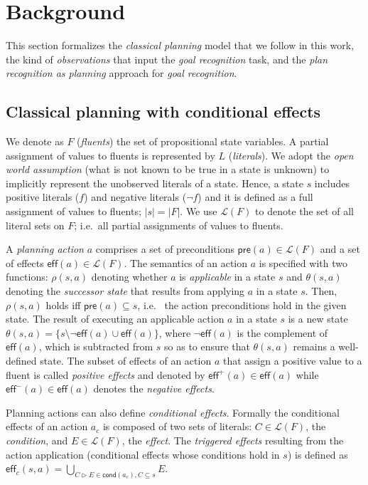 \documentclass[letterpaper]{article} %
\newcommand{\pre}{\mathsf{pre}}     %
\newcommand{\eff}{\mathsf{eff}}     %
\newcommand{\cond}{\mathsf{cond}}   %
\begin{document}
\section{Background}
\label{sec:background}
This section formalizes the {\em classical planning} model that we follow in this work, the kind of {\em observations} that input the {\em goal recognition} task, and the {\em plan recognition as planning} approach for {\em goal recognition}.  

\subsection{Classical planning with conditional effects}
We denote as $F$ ({\em fluents}) the set of  propositional state variables. A partial assignment of values to fluents is represented by $L$ ({\em literals}). We adopt the \emph{open world assumption} (what is not known to be true in a state is unknown) to implicitly represent the unobserved literals of a state. Hence, a state $s$ includes positive literals ($f$) and negative literals ($\neg f$) and it is defined as a full assignment of values to fluents; $|s|=|F|$. We use $\mathcal{L}(F)$ to denote the set of all literal sets on $F$; i.e.~all partial assignments of values to fluents.

A {\em planning action} $a$ comprises a set of preconditions $\pre(a)\in\mathcal{L}(F)$ and a set of effects $\eff(a)\in\mathcal{L}(F)$. The semantics of an action $a$ is specified with two functions: $\rho(s,a)$ denoting whether $a$ is {\em applicable} in a state $s$ and $\theta(s,a)$ denoting the {\em successor state} that results from applying $a$ in a state $s$. Then, $\rho(s,a)$ holds iff $\pre(a)\subseteq s$, i.e.~ the action preconditions hold in the given state. The result of executing an applicable action $a$ in a state $s$ is a new state $\theta(s,a)=\{s\setminus \neg\eff(a)\cup\eff(a)\}$, where $\neg\eff(a)$ is the complement of $\eff(a)$, which is subtracted from $s$ so as to ensure that $\theta(s,a)$ remains a well-defined state. The subset of effects of an action $a$ that assign a positive value to a fluent is called {\em positive effects} and denoted by $\eff^+(a)\in \eff(a)$ while $\eff^-(a)\in \eff(a)$ denotes the {\em negative effects}.

Planning actions can also define {\em conditional effects}. Formally the conditional effects of an action $a_c$ is composed of two sets of literals: $C\in\mathcal{L}(F)$, the {\em condition}, and $E\in\mathcal{L}(F)$, the {\em effect}. The {\em triggered effects} resulting from the action application (conditional effects whose conditions hold in $s$) is defined as $\eff_c(s,a)=\bigcup_{C\rhd E\in\cond(a_c),C\subseteq s} E$.
\end{document}
